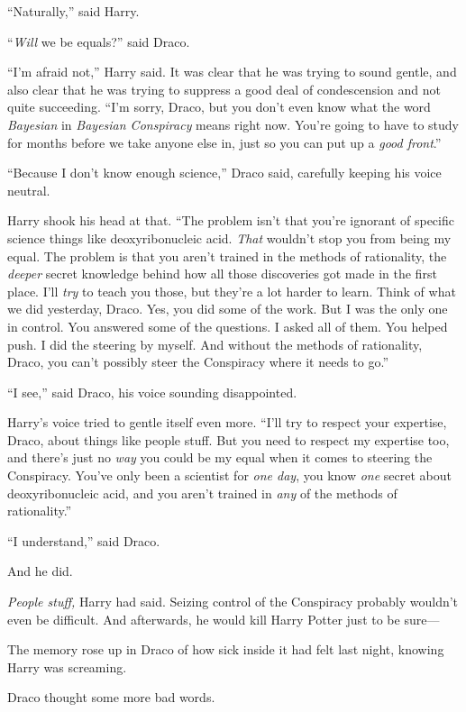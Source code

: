 “Naturally,” said Harry.

“\emph{Will} we be equals?” said Draco.

“I’m afraid not,” Harry said. It was clear that he was trying to sound gentle, and also clear that he was trying to suppress a good deal of condescension and not quite succeeding. “I’m sorry, Draco, but you don’t even know what the word \emph{Bayesian} in \emph{Bayesian Conspiracy} means right now. You’re going to have to study for months before we take anyone else in, just so you can put up a \emph{good front}.”

“Because I don’t know enough science,” Draco said, carefully keeping his voice neutral.

Harry shook his head at that. “The problem isn’t that you’re ignorant of specific science things like deoxyribonucleic acid. \emph{That} wouldn’t stop you from being my equal. The problem is that you aren’t trained in the methods of rationality, the \emph{deeper} secret knowledge behind how all those discoveries got made in the first place. I’ll \emph{try} to teach you those, but they’re a lot harder to learn. Think of what we did yesterday, Draco. Yes, you did some of the work. But I was the only one in control. You answered some of the questions. I asked all of them. You helped push. I did the steering by myself. And without the methods of rationality, Draco, you can’t possibly steer the Conspiracy where it needs to go.”

“I see,” said Draco, his voice sounding disappointed.

Harry’s voice tried to gentle itself even more. “I’ll try to respect your expertise, Draco, about things like people stuff. But you need to respect my expertise too, and there’s just no \emph{way} you could be my equal when it comes to steering the Conspiracy. You’ve only been a scientist for \emph{one day}, you know \emph{one} secret about deoxyribonucleic acid, and you aren’t trained in \emph{any} of the methods of rationality.”

“I understand,” said Draco.

And he did.

\emph{People stuff,} Harry had said. Seizing control of the Conspiracy probably wouldn’t even be difficult. And afterwards, he would kill Harry Potter just to be sure—

The memory rose up in Draco of how sick inside it had felt last night, knowing Harry was screaming.

Draco thought some more bad words.

